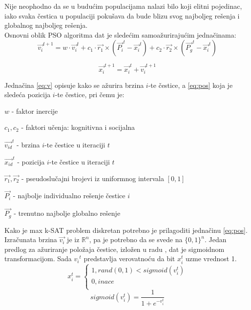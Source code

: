 \documentclass{article}
\begin{document}
Nije neophodno da se u budućim populacijama nalazi bilo koji elitni pojedinac, iako svaka čestica u populaciji pokušava da bude blizu svog najboljeg rešenja i globalnog najboljeg rešenja. \\ 


Osnovni oblik PSO algoritma dat je sledećim samoažurirajućim jednačinama: \\ 
\begin{equation}\label{eq:v}
\vec{v_{i}}^{t+1} = w \cdot \vec{v_{i}}^{t} + c_1 \cdot \vec{r_1} \times (\vec{P_{i}}^{t} - \vec{x_{i}}^{t}) + c_2\cdot \vec{r_2} \times (\vec{P_{g}}^{t} - \vec{x_{i}}^{t}) 
\end{equation}

\begin{equation}\label{eq:pos}
\vec{x_{i}}^{t+1} = \vec{x_{i}}^{t} + \vec{v_{i}}^{t+1} 
\end{equation}

Jednačina \ref{eq:v} opisuje kako se ažurira brzina $i$-te čestice, a \ref{eq:pos} koja je sledeća pozicija $i$-te čestice, pri čemu je: 

\begin{list}{•}{}
	\item $w$ - faktor inercije
	\item $c_1, c_2$ - faktori učenja: kognitivna i socijalna
	\item $\vec{v_{id}}^{t}$ - brzina $i$-te čestice u iteraciji $t$ 
	\item $\vec{x_{id}}^{t}$ - pozicija $i$-te čestice u iteraciji $t$ 
	\item $\vec{r_1}, \vec{r_2}$ - pseudoslučajni brojevi iz uniformnog intervala $[0,1]$
	\item $\vec{P_i}$ - najbolje individualno rešenje čestice $i$
	\item $\vec{P_g}$ - trenutno najbolje globalno rešenje\\ 
\end{list}

Kako je max k-SAT problem diskretan potrebno je prilagoditi jednačinu \ref{eq:pos}. Izračunata brzina $\vec{v_{i}}$ je iz $\mathbb{R}^n$, pa je potrebno da se svede na $\{ 0,1 \}^n$. Jedan predlog za ažuriranje položaja čestice, izložen u radu \cite{sigmoid}, dat je sigmoidnom transformacijom. Sada ${v_{i}}^{t}$ predstavlja verovatnoću da bit $x_{i}^{t}$ uzme vrednost 1.  \\

\begin{equation}\label{eq:posSIGMOID}
x_{i}^{t}=\begin{cases}
               1, rand(0,1) < sigmoid(v_{i}^{t})\\
               0, inace\\
            \end{cases}
\end{equation}\label{eq:sigmoid}
\begin{equation}
sigmoid(v_{i}^{t}) = \frac{1}{1+e^{-v_{i}^{t}}}
\end{equation}
 
\end{document}
